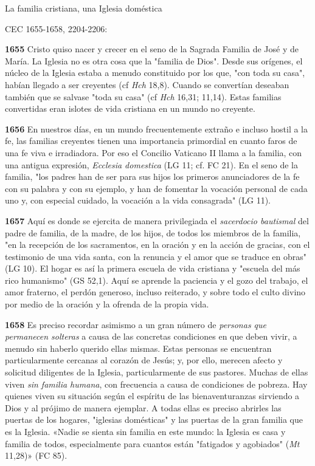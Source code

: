 \documentclass[]{article}
\begin{document}
La familia cristiana, una Iglesia doméstica

CEC 1655-1658, 2204-2206:

\textbf{1655} Cristo quiso nacer y crecer en el seno de la Sagrada
Familia de José y de María. La Iglesia no es otra cosa que la "familia
de Dios". Desde sus orígenes, el núcleo de la Iglesia estaba a menudo
constituido por los que, "con toda su casa", habían llegado a ser
creyentes (cf \emph{Hch} 18,8). Cuando se convertían deseaban también
que se salvase "toda su casa" (cf \emph{Hch} 16,31; 11,14). Estas
familias convertidas eran islotes de vida cristiana en un mundo no
creyente.

\textbf{1656} En nuestros días, en un mundo frecuentemente extraño e
incluso hostil a la fe, las familias creyentes tienen una importancia
primordial en cuanto faros de una fe viva e irradiadora. Por eso el
Concilio Vaticano II llama a la familia, con una antigua expresión,
\emph{Ecclesia domestica} (LG 11; cf. FC 21). En el seno de la familia,
"los padres han de ser para sus hijos los primeros anunciadores de la fe
con su palabra y con su ejemplo, y han de fomentar la vocación personal
de cada uno y, con especial cuidado, la vocación a la vida consagrada"
(LG 11).

\textbf{1657} Aquí es donde se ejercita de manera privilegiada el
\emph{sacerdocio bautismal} del padre de familia, de la madre, de los
hijos, de todos los miembros de la familia, "en la recepción de los
sacramentos, en la oración y en la acción de gracias, con el testimonio
de una vida santa, con la renuncia y el amor que se traduce en obras"
(LG 10). El hogar es así la primera escuela de vida cristiana y "escuela
del más rico humanismo" (GS 52,1). Aquí se aprende la paciencia y el
gozo del trabajo, el amor fraterno, el perdón generoso, incluso
reiterado, y sobre todo el culto divino por medio de la oración y la
ofrenda de la propia vida.

\textbf{1658} Es preciso recordar asimismo a un gran número de
\emph{personas que permanecen solteras} a causa de las concretas
condiciones en que deben vivir, a menudo sin haberlo querido ellas
mismas. Estas personas se encuentran particularmente cercanas al corazón
de Jesús; y, por ello, merecen afecto y solicitud diligentes de la
Iglesia, particularmente de sus pastores. Muchas de ellas viven
\emph{sin familia humana}, con frecuencia a causa de condiciones de
pobreza. Hay quienes viven su situación según el espíritu de las
bienaventuranzas sirviendo a Dios y al prójimo de manera ejemplar. A
todas ellas es preciso abrirles las puertas de los hogares, "iglesias
domésticas" y las puertas de la gran familia que es la Iglesia. «Nadie
se sienta sin familia en este mundo: la Iglesia es casa y familia de
todos, especialmente para cuantos están "fatigados y agobiados"
(\emph{Mt} 11,28)» (FC 85).
\end{document}
